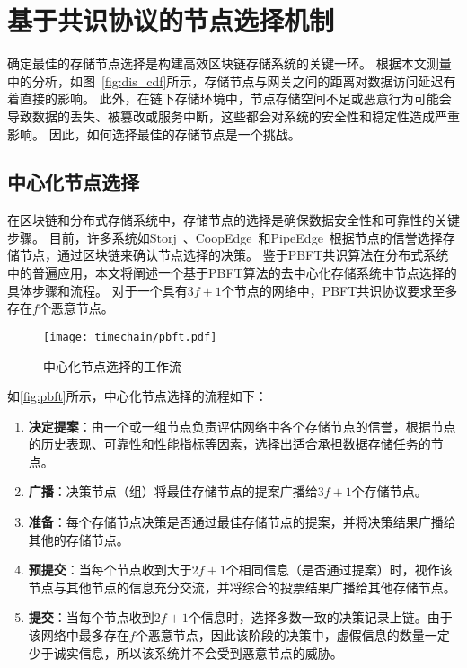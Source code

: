 \chapter{基于共识协议的节点选择机制}
\label{sec:consensus}
确定最佳的存储节点选择是构建高效区块链存储系统的关键一环。
根据本文测量中的分析，如图~\autoref{fig:dis_cdf}所示，存储节点与网关之间的距离对数据访问延迟有着直接的影响。
此外，在链下存储环境中，节点存储空间不足或恶意行为可能会导致数据的丢失、被篡改或服务中断，这些都会对系统的安全性和稳定性造成严重影响。
因此，如何选择最佳的存储节点是一个挑战。

\section{中心化节点选择}
在区块链和分布式存储系统中，存储节点的选择是确保数据安全性和可靠性的关键步骤。
目前，许多系统如Storj~\cite{storj2018storj}、CoopEdge~\cite{yuan2021coopedge}和PipeEdge~\cite{yuan2023pipeedge}根据节点的信誉选择存储节点，通过区块链来确认节点选择的决策。
鉴于PBFT共识算法在分布式系统中的普遍应用，本文将阐述一个基于PBFT算法的去中心化存储系统中节点选择的具体步骤和流程。
对于一个具有$3f+1$个节点的网络中，PBFT共识协议要求至多存在$f$个恶意节点。

\begin{figure}[t]
    \centering
    \texttt{[image: timechain/pbft.pdf]}
    \caption{中心化节点选择的工作流}
    \label{fig:pbft}
\end{figure}

如\autoref{fig:pbft}所示，中心化节点选择的流程如下：
\begin{enumerate}
    \item \textbf{决定提案}：由一个或一组节点负责评估网络中各个存储节点的信誉，根据节点的历史表现、可靠性和性能指标等因素，选择出适合承担数据存储任务的节点。
    \item \textbf{广播}：决策节点（组）将最佳存储节点的提案广播给$3f+1$个存储节点。
    \item \textbf{准备}：每个存储节点决策是否通过最佳存储节点的提案，并将决策结果广播给其他的存储节点。
    \item \textbf{预提交}：当每个节点收到大于$2f+1$个相同信息（是否通过提案）时，视作该节点与其他节点的信息充分交流，并将综合的投票结果广播给其他存储节点。
    \item \textbf{提交}：当每个节点收到$2f+1$个信息时，选择多数一致的决策记录上链。由于该网络中最多存在$f$个恶意节点，因此该阶段的决策中，虚假信息的数量一定少于诚实信息，所以该系统并不会受到恶意节点的威胁。
\end{enumerate}

